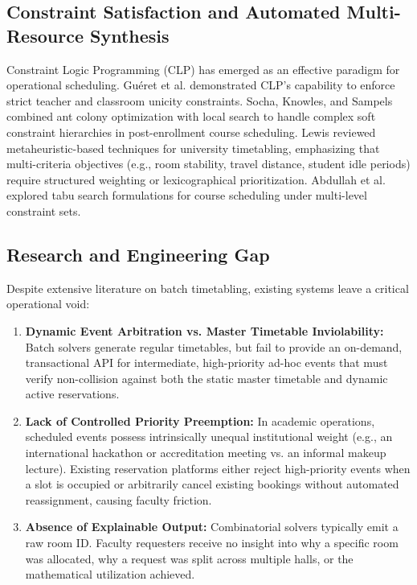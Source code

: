 \documentclass[conference]{IEEEtran}
\begin{document}
\subsection{Constraint Satisfaction and Automated Multi-Resource Synthesis}
Constraint Logic Programming (CLP) has emerged as an effective paradigm for operational scheduling. Gu{\'e}ret et al. \cite{gueret1996building} demonstrated CLP's capability to enforce strict teacher and classroom unicity constraints. Socha, Knowles, and Sampels \cite{socha2002max} combined ant colony optimization with local search to handle complex soft constraint hierarchies in post-enrollment course scheduling. Lewis \cite{lewis2008survey} reviewed metaheuristic-based techniques for university timetabling, emphasizing that multi-criteria objectives (e.g., room stability, travel distance, student idle periods) require structured weighting or lexicographical prioritization. Abdullah et al. \cite{abdullah2004tabu} explored tabu search formulations for course scheduling under multi-level constraint sets.

\subsection{Research and Engineering Gap}
Despite extensive literature on batch timetabling, existing systems leave a critical operational void:
\begin{enumerate}
    \item \textbf{Dynamic Event Arbitration vs. Master Timetable Inviolability:} Batch solvers generate regular timetables, but fail to provide an on-demand, transactional API for intermediate, high-priority ad-hoc events that must verify non-collision against both the static master timetable and dynamic active reservations.
    \item \textbf{Lack of Controlled Priority Preemption:} In academic operations, scheduled events possess intrinsically unequal institutional weight (e.g., an international hackathon or accreditation meeting vs. an informal makeup lecture). Existing reservation platforms either reject high-priority events when a slot is occupied or arbitrarily cancel existing bookings without automated reassignment, causing faculty friction.
    \item \textbf{Absence of Explainable Output:} Combinatorial solvers typically emit a raw room ID. Faculty requesters receive no insight into why a specific room was allocated, why a request was split across multiple halls, or the mathematical utilization achieved.
\end{enumerate}
\end{document}
